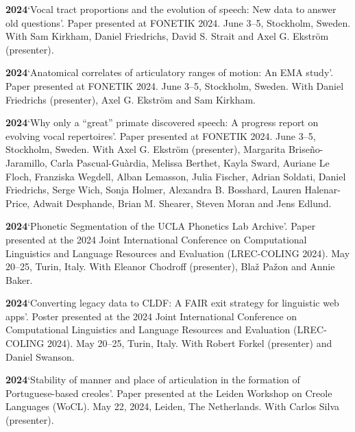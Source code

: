 \documentclass[11pt]{article}
\newcommand{\hangpara}{
 \setlength{\parindent}{0in} %
 \hangindent=0.42in %
}
\begin{document}
\hangpara
\vskip 6pt
{\bf 2024}\hspace{1ex}`Vocal tract proportions and the evolution of speech: New data to answer old questions'. Paper presented at FONETIK 2024. June 3--5, Stockholm, Sweden. With Sam Kirkham, Daniel Friedrichs, David S. Strait and Axel G. Ekström (presenter).

\hangpara
\vskip 6pt
{\bf 2024}\hspace{1ex}`Anatomical correlates of articulatory ranges of motion: An EMA study'. Paper presented at FONETIK 2024. June 3--5, Stockholm, Sweden. With Daniel Friedrichs (presenter), Axel G. Ekström and Sam Kirkham.

\hangpara
\vskip 6pt
{\bf 2024}\hspace{1ex}`Why only a ``great'' primate discovered speech: A progress report on evolving vocal repertoires'. Paper presented at FONETIK 2024. June 3--5, Stockholm, Sweden. With Axel G. Ekström (presenter), Margarita Briseño-Jaramillo, Carla Pascual-Guàrdia, Melissa Berthet, Kayla Sward, Auriane Le Floch, Franziska Wegdell, Alban Lemasson, Julia Fischer, Adrian Soldati, Daniel Friedrichs, Serge Wich, Sonja Holmer, Alexandra B. Bosshard, Lauren Halenar-Price, Adwait Desphande, Brian M. Shearer, Steven Moran and Jens Edlund.

\hangpara
\vskip 6pt
{\bf 2024}\hspace{1ex}`Phonetic Segmentation of the UCLA Phonetics Lab Archive'. Paper presented at the 2024 Joint International Conference on Computational Linguistics and Language Resources and Evaluation (LREC-COLING 2024). May 20--25, Turin, Italy. With Eleanor Chodroff (presenter), Blaž Pažon and Annie Baker. %

\hangpara
\vskip 6pt
{\bf 2024}\hspace{1ex}`Converting legacy data to CLDF: A FAIR exit strategy for linguistic web apps'. Poster presented at the 2024 Joint International Conference on Computational Linguistics and Language Resources and Evaluation (LREC-COLING 2024). May 20--25, Turin, Italy. With Robert Forkel (presenter) and Daniel Swanson. %

\hangpara
\vskip 6pt
{\bf 2024}\hspace{1ex}`Stability of manner and place of articulation in the formation of Portuguese-based creoles'. Paper presented at the Leiden Workshop on Creole Languages (WoCL). May 22, 2024, Leiden, The Netherlands. With Carlos Silva (presenter). %
\end{document}
